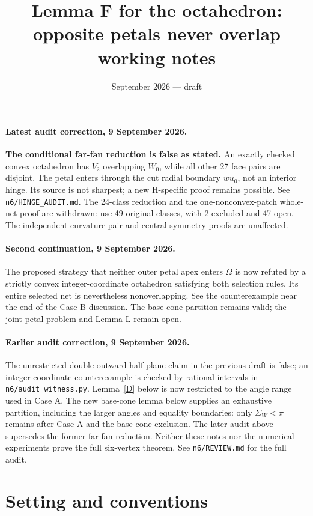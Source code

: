 \documentclass[11pt]{article}
\title{Lemma F for the octahedron: opposite petals never overlap\\ \large working notes}
\author{}
\date{September 2026 --- draft}
\theoremstyle{definition}
\theoremstyle{remark}
\begin{document}
\maketitle

\paragraph{Latest audit correction, 9 September 2026.}
\textbf{The conditional far-fan reduction is false as stated.}
An exactly checked convex octahedron has $V_2$ overlapping $W_0$, while all
other 27 face pairs are disjoint. The petal enters through the cut radial
boundary $wu_0$, not an interior hinge. Its source is not sharpest; a new
H-specific proof remains possible. See \texttt{n6/HINGE\_AUDIT.md}.
The 24-class reduction and the one-nonconvex-patch whole-net proof are
withdrawn: use 49 original classes, with 2 excluded and 47 open.
The independent curvature-pair and central-symmetry proofs are unaffected.

\paragraph{Second continuation, 9 September 2026.}
The proposed strategy that neither outer petal apex enters $\Omega$ is now
refuted by a strictly convex integer-coordinate octahedron satisfying both
selection rules. Its entire selected net is nevertheless nonoverlapping.
See the counterexample near the end of the Case B discussion. The base-cone
partition remains valid; the joint-petal problem and Lemma L remain open.

\paragraph{Earlier audit correction, 9 September 2026.}
The unrestricted double-outward half-plane claim in the previous draft is false;
an integer-coordinate counterexample is checked by rational intervals in
\texttt{n6/audit\_witness.py}. Lemma~\ref{D} below is now restricted to the
angle range used in Case A. The new base-cone lemma below supplies an exhaustive
partition, including the larger angles and equality boundaries: only
$\Sigma_W<\pi$ remains after Case A and the base-cone exclusion. The later audit
above supersedes the former far-fan reduction. Neither these notes nor the numerical experiments
prove the full six-vertex theorem. See \texttt{n6/REVIEW.md} for the full audit.

\section*{Setting and conventions}
\end{document}
